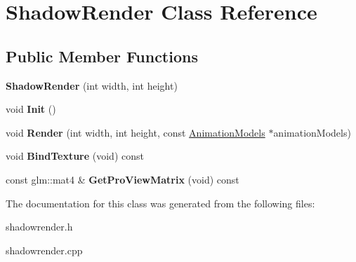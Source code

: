 \hypertarget{classShadowRender}{\section{\-Shadow\-Render \-Class \-Reference}
\label{classShadowRender}
}
\subsection*{\-Public \-Member \-Functions}
\begin{DoxyCompactItemize}
\item 
\hypertarget{classShadowRender_ad1a1341925ec8819980f5c1553f380be}{{\bfseries \-Shadow\-Render} (int width, int height)}\label{classShadowRender_ad1a1341925ec8819980f5c1553f380be}

\item 
\hypertarget{classShadowRender_a52e948acef634915df96cb489f69bc1c}{void {\bfseries \-Init} ()}\label{classShadowRender_a52e948acef634915df96cb489f69bc1c}

\item 
\hypertarget{classShadowRender_aed016f7894f22533f04f52cbf33447e0}{void {\bfseries \-Render} (int width, int height, const \hyperlink{classAnimationModels}{\-Animation\-Models} $\ast$animation\-Models)}\label{classShadowRender_aed016f7894f22533f04f52cbf33447e0}

\item 
\hypertarget{classShadowRender_a3b4d1f1c5604badf5b2aaa4449451896}{void {\bfseries \-Bind\-Texture} (void) const }\label{classShadowRender_a3b4d1f1c5604badf5b2aaa4449451896}

\item 
\hypertarget{classShadowRender_a7251c69265a5a890e4237c54d9a661c3}{const glm\-::mat4 \& {\bfseries \-Get\-Pro\-View\-Matrix} (void) const }\label{classShadowRender_a7251c69265a5a890e4237c54d9a661c3}

\end{DoxyCompactItemize}


\-The documentation for this class was generated from the following files\-:\begin{DoxyCompactItemize}
\item 
shadowrender.\-h\item 
shadowrender.\-cpp\end{DoxyCompactItemize}
